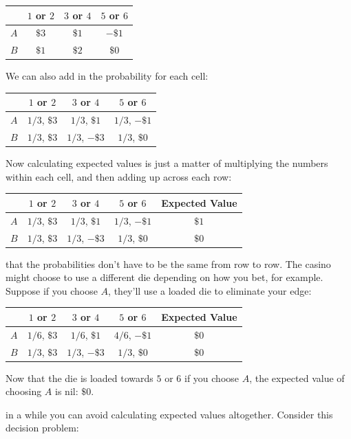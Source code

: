 \documentclass[justified]{tufte-book}
\theoremstyle{definition}
\theoremstyle{definition}
\theoremstyle{definition}
\theoremstyle{remark}
\begin{document}
\begin{longtable}[]{@{}lccc@{}}
\toprule
& \(1\) or \(2\) & \(3\) or \(4\) & \(5\) or \(6\)\tabularnewline
\midrule
\endhead
\(A\) & \(\$3\) & \(\$1\) & \(-\$1\)\tabularnewline
\(B\) & \(\$1\) & \(\$2\) & \(\$0\)\tabularnewline
\bottomrule
\end{longtable}

We can also add in the probability for each cell:

\begin{longtable}[]{@{}lccc@{}}
\toprule
& \(1\) or \(2\) & \(3\) or \(4\) & \(5\) or \(6\)\tabularnewline
\midrule
\endhead
\(A\) & \(1/3\), \(\$3\) & \(1/3\), \(\$1\) & \(1/3\),
\(-\$1\)\tabularnewline
\(B\) & \(1/3\), \(\$3\) & \(1/3\), \(-\$3\) & \(1/3\),
\(\$0\)\tabularnewline
\bottomrule
\end{longtable}

Now calculating expected values is just a matter of multiplying the
numbers within each cell, and then adding up across each row:

\begin{longtable}[]{@{}lcccc@{}}
\toprule
& \(1\) or \(2\) & \(3\) or \(4\) & \(5\) or \(6\) & Expected
Value\tabularnewline
\midrule
\endhead
\(A\) & \(1/3\), \(\$3\) & \(1/3\), \(\$1\) & \(1/3\), \(-\$1\) &
\(\$1\)\tabularnewline
\(B\) & \(1/3\), \(\$3\) & \(1/3\), \(-\$3\) & \(1/3\), \(\$0\) &
\(\$0\)\tabularnewline
\bottomrule
\end{longtable}

 that the probabilities don't have to be the same from
row to row. The casino might choose to use a different die depending on
how you bet, for example. Suppose if you choose \(A\), they'll use a
loaded die to eliminate your edge:

\begin{longtable}[]{@{}lcccc@{}}
\toprule
& \(1\) or \(2\) & \(3\) or \(4\) & \(5\) or \(6\) & Expected
Value\tabularnewline
\midrule
\endhead
\(A\) & \(1/6\), \(\$3\) & \(1/6\), \(\$1\) & \(4/6\), \(-\$1\) &
\(\$0\)\tabularnewline
\(B\) & \(1/3\), \(\$3\) & \(1/3\), \(-\$3\) & \(1/3\), \(\$0\) &
\(\$0\)\tabularnewline
\bottomrule
\end{longtable}

Now that the die is loaded towards \(5\) or \(6\) if you choose \(A\),
the expected value of choosing \(A\) is nil: \(\$0\).

 in a while you can avoid calculating expected values
altogether. Consider this decision problem:
\end{document}
